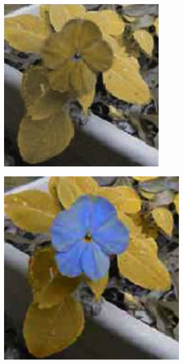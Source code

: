 \documentclass[10pt,twocolumn,letterpaper]{article}
\begin{document}
\begin{figure}[h]
\begin{subfigure}{0.23\textwidth}
    \includegraphics[width=\textwidth]{flower2.png}
    \caption{}
  \end{subfigure}
  \begin{subfigure}{0.23\textwidth}
    \includegraphics[width=\textwidth]{flower3.png}

\end{subfigure}
\end{figure}
\end{document}
